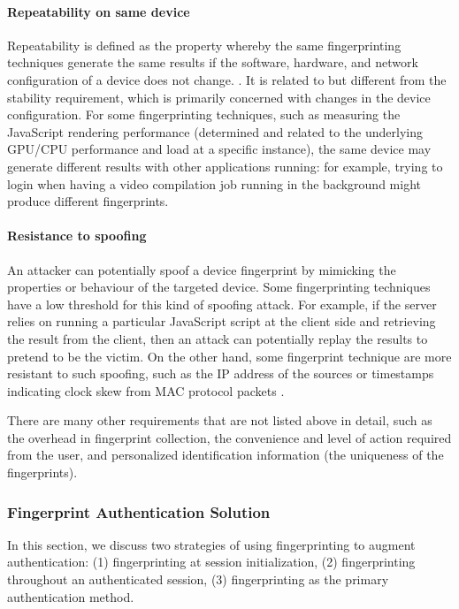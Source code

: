 \documentclass{acm_proc_article-sp}
\begin{document}
\paragraph{Repeatability on same device}
Repeatability is defined as the property whereby the same fingerprinting techniques generate the same results if the software, hardware, and network configuration of a device does not change. \cite{alca:dev}. It is related to but different from the stability requirement, which is primarily concerned  with changes in the device configuration.
For some  fingerprinting techniques, such as measuring the JavaScript rendering performance (determined and related to the underlying GPU/CPU performance and load at a specific instance), the same device may generate different results with other applications running: for example, trying to login when having a video compilation job running in the background might produce different fingerprints.

\paragraph {Resistance to spoofing}
An attacker can potentially spoof a device fingerprint by mimicking the properties or behaviour of the targeted device. Some fingerprinting techniques  have a low threshold for this kind of spoofing attack. For example, if the server relies on running a particular JavaScript script at the client side and retrieving the result from the client, then an attack can potentially replay the results to pretend to be the victim.
On the other hand, some fingerprint technique are more resistant to such spoofing, such as the IP address of the sources\cite{beverly:ip} or timestamps indicating clock skew from MAC protocol packets \cite{ara:wire}.

There are many other requirements that are not listed above in detail, such as the overhead in fingerprint collection, the convenience and level of action required from the user, and personalized identification information (the uniqueness of the fingerprints).


\subsubsection{Fingerprint Authentication Solution}
In this section, we discuss two strategies of using fingerprinting to augment authentication: (1) fingerprinting at session initialization, (2) fingerprinting throughout an authenticated session, (3) fingerprinting as the primary authentication method. 
\end{document}
